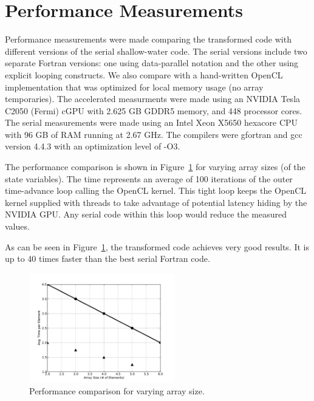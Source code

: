 \section{Performance Measurements}

Performance measurements were made comparing the transformed code with
different versions of the serial shallow-water code.  The serial
versions include two separate Fortran versions:
one using data-parallel notation and the other using explicit looping
constructs.
We also compare with a hand-written OpenCL implementation
that was optimized for local memory usage (no array temporaries).  The
accelerated measurments were made using an NVIDIA Tesla C2050 (Fermi) cGPU with
2.625 GB GDDR5 memory, and 448 processor cores.  The serial
measurements were made using an Intel Xeon X5650 hexacore CPU with 96 GB of RAM
running at 2.67 GHz.  The compilers were gfortran and gcc version 4.4.3
with an optimization level of -O3.



The performance comparison is shown in Figure~\ref{fig:cl-performance} for
varying array sizes (of the state variables).  The time represents an average
of 100 iterations of the outer time-advance loop calling the OpenCL kernel.
This tight loop keeps the OpenCL kernel supplied with threads to take
advantage of potential latency hiding by the NVIDIA GPU.  Any serial code
within this loop would reduce the measured values.

As can be seen in Figure~\ref{fig:cl-performance}, the transformed code achieves very
good results.  It is up to 40 times faster than the best serial Fortran code.


\begin{figure}[!t]
\centering
\includegraphics[width=2.5in]{cl-performance.pdf}
\caption{Performance comparison for varying array size.}
\label{fig:cl-performance}
\end{figure}
